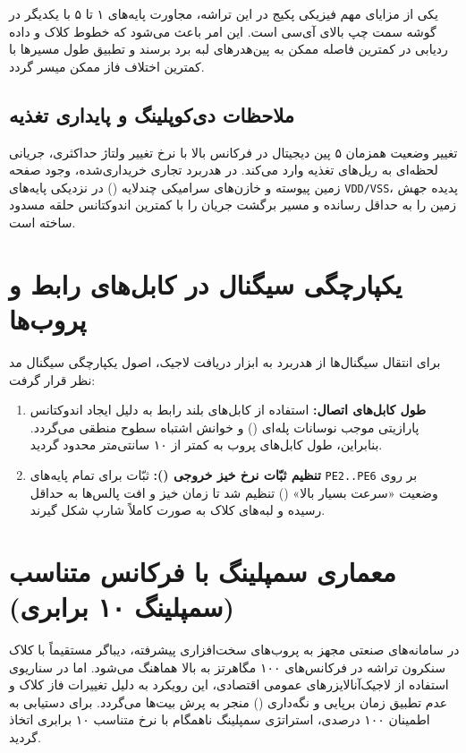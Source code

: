 یکی از مزایای مهم فیزیکی پکیج  در این تراشه، مجاورت پایه‌های ۱ تا ۵ با یکدیگر در گوشه سمت چپ بالای آی‌سی است. این امر باعث می‌شود که خطوط کلاک و داده ردیابی در کمترین فاصله ممکن به پین‌هدرهای لبه برد برسند و تطبیق طول مسیرها با کمترین اختلاف فاز ممکن میسر گردد.

\subsection{ملاحظات دی‌کوپلینگ و پایداری تغذیه}
تغییر وضعیت همزمان ۵ پین دیجیتال در فرکانس بالا با نرخ تغییر ولتاژ حداکثری، جریانی لحظه‌ای به ریل‌های تغذیه وارد می‌کند. در هدربرد تجاری خریداری‌شده، وجود صفحه زمین پیوسته و خازن‌های سرامیکی  چندلایه () در نزدیکی پایه‌های \texttt{VDD/VSS}، پدیده جهش زمین را به حداقل رسانده و مسیر برگشت جریان را با کمترین اندوکتانس حلقه مسدود ساخته است.

\section{یکپارچگی سیگنال در کابل‌های رابط و پروب‌ها}
برای انتقال سیگنال‌ها از هدربرد به ابزار دریافت لاجیک، اصول یکپارچگی سیگنال مد نظر قرار گرفت:
\begin{enumerate}
    \item \textbf{طول کابل‌های اتصال:} استفاده از کابل‌های بلند رابط به دلیل ایجاد اندوکتانس پارازیتی موجب نوسانات پله‌ای () و خوانش اشتباه سطوح منطقی می‌گردد. بنابراین، طول کابل‌های پروب به کمتر از ۱۰ سانتی‌متر محدود گردید.
    \item \textbf{تنظیم ثبّات نرخ خیز خروجی ():} ثبّات  برای تمام پایه‌های \texttt{PE2..PE6} بر روی وضعیت «سرعت بسیار بالا» () تنظیم شد تا زمان خیز و افت پالس‌ها به حداقل رسیده و لبه‌های کلاک به صورت کاملاً شارپ شکل گیرند.
\end{enumerate}

\section{معماری سمپلینگ با فرکانس متناسب (سمپلینگ ۱۰ برابری)}
\label{sec:sampling_strategy}
در سامانه‌های صنعتی مجهز به پروب‌های سخت‌افزاری پیشرفته، دیباگر مستقیماً با کلاک سنکرون تراشه در فرکانس‌های ۱۰۰ مگاهرتز به بالا هماهنگ می‌شود. اما در سناریوی استفاده از لاجیک‌آنالایزرهای عمومی اقتصادی، این رویکرد به دلیل تغییرات فاز کلاک و عدم تطبیق زمان برپایی و نگه‌داری () منجر به پرش بیت‌ها می‌گردد. برای دستیابی به اطمینان ۱۰۰ درصدی، استراتژی سمپلینگ ناهمگام با نرخ متناسب ۱۰ برابری اتخاذ گردید.

